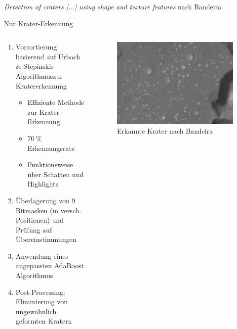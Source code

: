 \documentclass[9pt]{beamer}
\begin{document}
\begin{frame}{\textit{Detection of craters [...] using shape and texture features} nach Bandeira\footnotemark[1]}
\begin{center}
	\alert{Nur Krater-Erkennung}
\end{center}
\begin{columns}
	\begin{column}{.6\textwidth}
		\begin{enumerate}
		\item Vorsortierung basierend auf Urbach \& Stepinskis Algorithmus\footnotemark[2] zur Kratererkennung
		\begin{itemize}
			\item Effiziente Methode zur Krater-Erkennung
			\item $\SI{70}{\percent}$ Erkennungsrate
			\item Funktionsweise über Schatten und Highlights
		\end{itemize}
		\item Überlagerung von 9 Bitmasken (in versch. Positionen) und Prüfung auf Übereinstimmungen
		\item Anwendung eines angepassten AdaBoost Algorithmus
		\item Post-Processing: Eliminierung von ungewöhnlich geformten Kratern
		\end{enumerate}
	\end{column}
	\begin{column}{.4\textwidth}
		\begin{figure}[H]
			\includegraphics[width=\textwidth, keepaspectratio]{bandeira_detected.png}
			\caption{Erkannte Krater nach Bandeira}
		\end{figure}
	\end{column}
\end{columns}
\end{frame}
\end{document}
